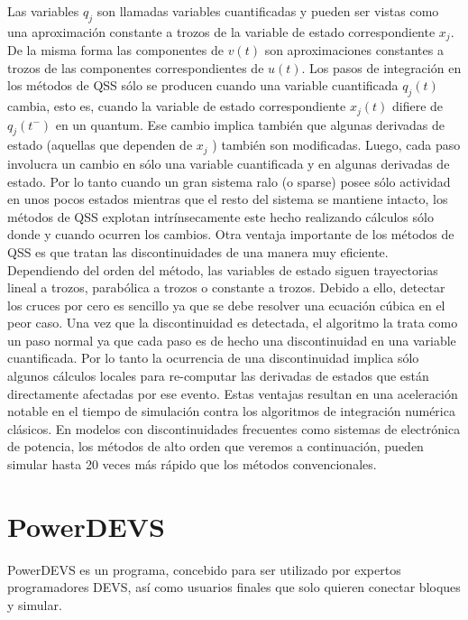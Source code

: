 \documentclass[a4paper,	11pt]{report}
\begin{document}
Las variables $q_j$ son llamadas variables cuantificadas y pueden ser vistas como una aproximación constante a trozos de la variable de estado correspondiente $x_j$. De la misma forma las componentes de $v(t)$ son aproximaciones constantes a trozos de las componentes correspondientes de $u(t)$.  Los pasos de integración en los métodos de QSS sólo se producen cuando una variable cuantificada $q_j (t)$ cambia, esto es, cuando la variable de estado correspondiente $x_j (t)$ difiere de $q_j(t^{-})$ en un quantum. Ese cambio implica también que algunas derivadas de estado (aquellas que dependen de $x_j$ ) también son modificadas. Luego, cada paso involucra un cambio en sólo una variable cuantificada y en algunas derivadas de estado. Por lo tanto cuando un gran sistema ralo (o sparse) posee sólo actividad en unos pocos estados mientras que el resto del sistema se mantiene intacto, los métodos de QSS explotan intrínsecamente este hecho realizando cálculos sólo donde y cuando ocurren los cambios.
Otra ventaja importante de los métodos de QSS es que tratan las discontinuidades de una manera muy eficiente. Dependiendo del orden del método, las variables de estado siguen trayectorias lineal a trozos, parabólica a trozos o constante a trozos. Debido a ello, detectar los cruces por cero es sencillo ya que se debe resolver una ecuación cúbica en el peor caso. Una vez que la discontinuidad es detectada, el algoritmo la trata como un paso normal ya que cada paso es de hecho una discontinuidad en una variable cuantificada. Por lo tanto la ocurrencia de una discontinuidad implica sólo algunos cálculos locales para re-computar las derivadas de estados que están directamente afectadas por ese evento.
Estas ventajas resultan en una aceleración notable en el tiempo de simulación contra los algoritmos de integración numérica clásicos. En modelos con discontinuidades frecuentes como sistemas de electrónica de potencia, los métodos de alto orden que veremos a continuación, pueden simular hasta 20 veces más rápido que los métodos convencionales.

\section{PowerDEVS}
PowerDEVS es un programa, concebido para ser utilizado por expertos programadores DEVS, así como usuarios finales que solo quieren conectar bloques y simular.
\end{document}
